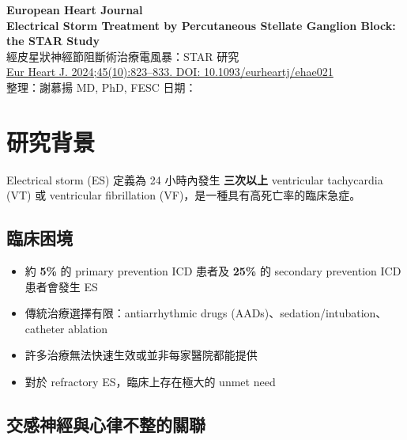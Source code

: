 \documentclass[12pt,a4paper]{article}
\begin{document}
\begin{center}
{\LARGE\bfseries\textcolor{emergency_red}{European Heart Journal}}\\[0.5cm]
{\Large\textbf{Electrical Storm Treatment by Percutaneous Stellate Ganglion Block: the STAR Study}}\\[0.3cm]
{\large 經皮星狀神經節阻斷術治療電風暴：STAR 研究}\\[0.5cm]
{\normalsize \href{https://doi.org/10.1093/eurheartj/ehae021}{Eur Heart J. 2024;45(10):823--833. DOI: 10.1093/eurheartj/ehae021}}\\[0.3cm]
{\normalsize 整理：謝慕揚 MD, PhD, FESC \quad 日期：\mydate}
\end{center}

\vspace{0.5cm}

\section{研究背景}

Electrical storm (ES) 定義為 24 小時內發生 \textbf{三次以上} ventricular tachycardia (VT) 或 ventricular fibrillation (VF)，是一種具有高死亡率的臨床急症。

\subsection{臨床困境}

\begin{itemize}
    \item 約 \textbf{5\%} 的 primary prevention ICD 患者及 \textbf{25\%} 的 secondary prevention ICD 患者會發生 ES
    \item 傳統治療選擇有限：antiarrhythmic drugs (AADs)、sedation/intubation、catheter ablation
    \item 許多治療無法快速生效或並非每家醫院都能提供
    \item 對於 refractory ES，臨床上存在極大的 unmet need
\end{itemize}

\subsection{交感神經與心律不整的關聯}
\end{document}

